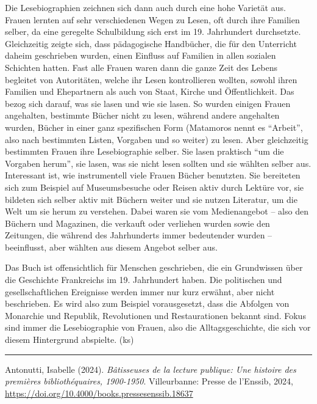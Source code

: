 \documentclass[a4paper,
fontsize=11pt,
oneside,
numbers=noperiodatend,
parskip=half-,
bibliography=totoc,
final
]{scrartcl}
\begin{document}
Die Lesebiographien zeichnen sich dann auch durch eine hohe Varietät
aus. Frauen lernten auf sehr verschiedenen Wegen zu Lesen, oft durch
ihre Familien selber, da eine geregelte Schulbildung sich erst im 19.
Jahrhundert durchsetzte. Gleichzeitig zeigte sich, dass pädagogische
Handbücher, die für den Unterricht daheim geschrieben wurden, einen
Einfluss auf Familien in allen sozialen Schichten hatten. Fast alle
Frauen waren dann die ganze Zeit des Lebens begleitet von Autoritäten,
welche ihr Lesen kontrollieren wollten, sowohl ihren Familien und
Ehepartnern als auch von Staat, Kirche und Öffentlichkeit. Das bezog
sich darauf, was sie lasen und wie sie lasen. So wurden einigen Frauen
angehalten, bestimmte Bücher nicht zu lesen, während andere angehalten
wurden, Bücher in einer ganz spezifischen Form (Matamoros nennt es
\enquote{Arbeit}, also nach bestimmten Listen, Vorgaben und so weiter)
zu lesen. Aber gleichzeitig bestimmten Frauen ihre Lesebiographie
selber. Sie lasen praktisch \enquote{um die Vorgaben herum}, sie lasen,
was sie nicht lesen sollten und sie wählten selber aus. Interessant ist,
wie instrumentell viele Frauen Bücher benutzten. Sie bereiteten sich zum
Beispiel auf Museumsbesuche oder Reisen aktiv durch Lektüre vor, sie
bildeten sich selber aktiv mit Büchern weiter und sie nutzen Literatur,
um die Welt um sie herum zu verstehen. Dabei waren sie vom Medienangebot
-- also den Büchern und Magazinen, die verkauft oder verliehen wurden
sowie den Zeitungen, die während des Jahrhunderts immer bedeutender
wurden -- beeinflusst, aber wählten aus diesem Angebot selber aus.

Das Buch ist offensichtlich für Menschen geschrieben, die ein
Grundwissen über die Geschichte Frankreichs im 19. Jahrhundert haben.
Die politischen und gesellschaftlichen Ereignisse werden immer nur kurz
erwähnt, aber nicht beschrieben. Es wird also zum Beispiel
vorausgesetzt, dass die Abfolgen von Monarchie und Republik,
Revolutionen und Restaurationen bekannt sind. Fokus sind immer die
Lesebiographie von Frauen, also die Alltagsgeschichte, die sich vor
diesem Hintergrund abspielte. (ks)

\begin{center}\rule{0.5\linewidth}{0.5pt}\end{center}

Antonutti, Isabelle (2024). \emph{Bâtisseuses de la lecture publique:
Une histoire des premières bibliothéquaires, 1900-1950}. Villeurbanne:
Presse de l'Enssib, 2024,
\url{https://doi.org/10.4000/books.pressesenssib.18637}
\end{document}
